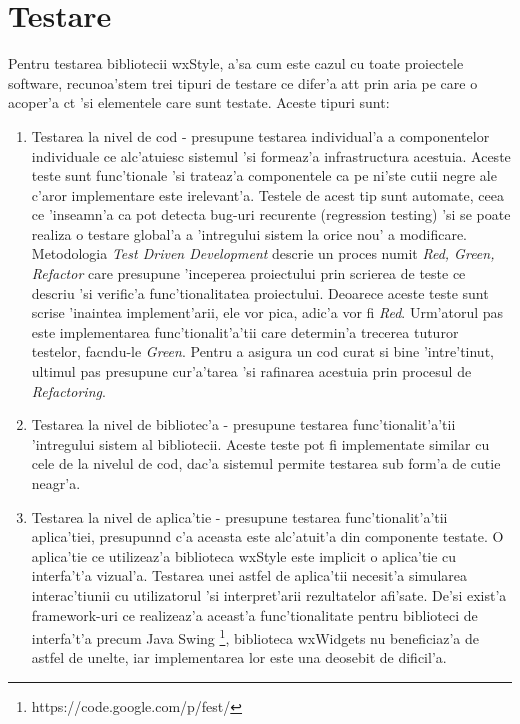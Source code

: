 \chapter{Testare}
\pagestyle{headings}

Pentru testarea bibliotecii wxStyle, a'sa cum este cazul cu toate proiectele software, recunoa'stem trei tipuri de testare ce difer'a at{\ia}t prin aria pe care o acoper'a c{\ia}t 'si elementele care sunt testate. Aceste tipuri sunt:

\begin{enumerate}
\item Testarea la nivel de cod - presupune testarea individual'a a componentelor individuale ce alc'atuiesc sistemul 'si formeaz'a infrastructura acestuia. Aceste teste sunt func'tionale 'si trateaz'a componentele ca pe ni'ste cutii negre ale c'aror implementare este irelevant'a. Testele de acest tip sunt automate, ceea ce 'inseamn'a ca pot detecta bug-uri recurente (regression testing) 'si se poate realiza o testare global'a a 'intregului sistem la orice nou' a modificare. Metodologia \emph{Test Driven Development} descrie un proces numit \emph{Red, Green, Refactor} care presupune 'inceperea proiectului prin scrierea de teste ce descriu 'si verific'a func'tionalitatea proiectului. Deoarece aceste teste sunt scrise 'inaintea implement'arii, ele vor pica, adic'a vor fi \emph{Red}. Urm'atorul pas este implementarea func'tionalit'a'tii care determin'a trecerea tuturor testelor, fac{\ia}ndu-le \emph{Green}. Pentru a asigura un cod curat si bine 'intre'tinut, ultimul pas presupune cur'a'tarea 'si rafinarea acestuia prin procesul de \emph{Refactoring}.
\item Testarea la nivel de bibliotec'a - presupune testarea func'tionalit'a'tii 'intregului sistem al bibliotecii. Aceste teste pot fi implementate similar cu cele de la nivelul de cod, dac'a sistemul permite testarea sub form'a de cutie neagr'a.
\item Testarea la nivel de aplica'tie - presupune testarea func'tionalit'a'tii aplica'tiei, presupun{\ia}nd c'a aceasta este alc'atuit'a din componente testate. O aplica'tie ce utilizeaz'a biblioteca wxStyle este implicit o aplica'tie cu interfa't'a vizual'a. Testarea unei astfel de aplica'tii necesit'a simularea interac'tiunii cu utilizatorul 'si interpret'arii rezultatelor afi'sate. De'si exist'a framework-uri ce realizeaz'a aceast'a func'tionalitate pentru biblioteci de interfa't'a precum Java Swing \footnote{https://code.google.com/p/fest/}, biblioteca wxWidgets nu beneficiaz'a de astfel de unelte, iar implementarea lor este una deosebit de dificil'a.\cite{tdddoesntwork}
\end{enumerate}

